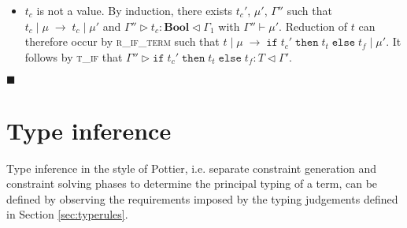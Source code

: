 \documentclass{article}
\newcommand{\rifexpr}{\textsc{r\_if\_term} }
\newcommand{\tif}{\textsc{t\_if} }
\newcommand{\typerule}[4]{#1 \triangleright #2 : #3 \triangleleft #4}
\newcommand{\oprule}[4]{#1 \mid #2\;\longrightarrow\;#3 \mid #4}
\newcommand{\boolt}{\mathbf{Bool}}
\newcommand{\ift}[3]{\mathtt{if} \; #1 \; \mathtt{then} \; #2 \; \mathtt{else} \; #3}
\newcommand{\qed}{$\blacksquare$}
\newenvironment{proof}{\vspace{1ex}\noindent{\bf Proof}\hspace{0.5em}}
  {\hfill\qed\vspace{1ex}}
\begin{document}
\begin{proof}
\begin{itemize}
\begin{itemize}
	\item $t_c$ is not a value. By induction, there exists $t_c'$,
	$\mu'$, $\Gamma''$ such that 
	$\oprule{t_c}{\mu}{t_c}{\mu'}$ and 
	$\typerule{\Gamma''}{t_c}{\boolt}{\Gamma_1}$ with $\Gamma'' \vdash \mu'$. 
	Reduction of $t$ can therefore occur by \rifexpr such that
	$\oprule{t}{\mu}{\ift{t_c'}{t_t}{t_f}}{\mu'}$. It follows
	by \tif that $\typerule{\Gamma''}{\ift{t_c'}{t_t}{t_f}}{T}{\Gamma'}$.
	\end{itemize}

\end{itemize}
\end{proof}

\section{Type inference}

Type inference in the style of Pottier, i.e. separate constraint generation
and constraint solving phases to determine the principal typing of a term,
can be defined by observing the requirements imposed by the typing judgements
defined in Section \ref{sec:typerules}.

\ottgrammartabular{
\ottC\ottinterrule
\ottctxc\ottinterrule
\otttyc\ottinterrule
\ottprotoc\ottinterrule
}
\end{document}
